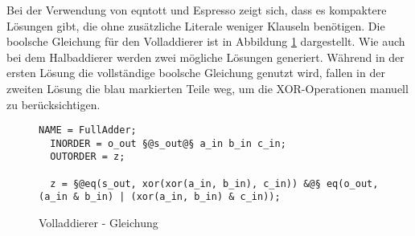 Bei der Verwendung von eqntott und Espresso zeigt sich, dass es kompaktere Lösungen gibt, die ohne zusätzliche Literale weniger Klauseln benötigen.
Die boolsche Gleichung für den Volladdierer ist in Abbildung \ref{fig:fulladder_qen} dargestellt. Wie auch bei dem Halbaddierer werden zwei mögliche
Lösungen generiert. Während in der ersten Lösung die vollständige boolsche Gleichung genutzt wird, fallen in der zweiten Lösung die blau markierten
Teile weg, um die XOR-Operationen manuell zu berücksichtigen.
\begin{figure}[!h]
  \centering
  \begin{lstlisting}[]
  NAME = FullAdder;
  INORDER = o_out §@s_out@§ a_in b_in c_in;
  OUTORDER = z;

  z = §@eq(s_out, xor(xor(a_in, b_in), c_in)) &@§ eq(o_out, (a_in & b_in) | (xor(a_in, b_in) & c_in));
  \end{lstlisting}
  \caption{Volladdierer - Gleichung}
  \label{fig:fulladder_qen}
\end{figure}

